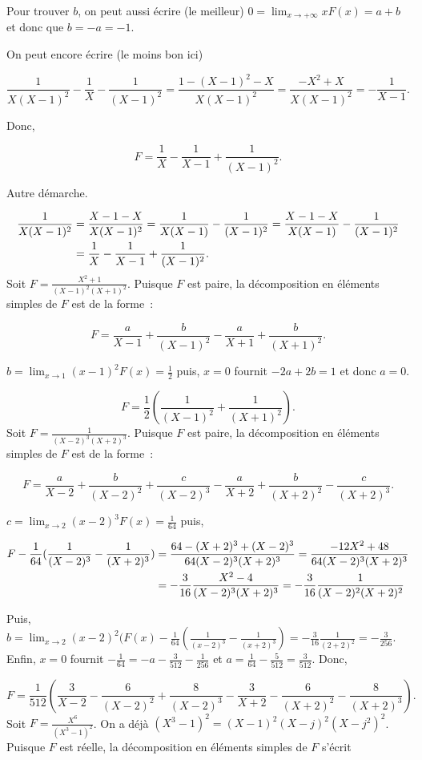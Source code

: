 {{Pour trouver $b$, on peut aussi écrire (le meilleur) $0=\lim_{x\rightarrow +\infty}xF(x)=a+b$ et donc que $b=-a=-1$.

On peut encore écrire (le moins bon ici)

$$\frac{1}{X(X-1)^2}-\frac{1}{X}-\frac{1}{(X-1)^2}=\frac{1-(X-1)^2-X}{X(X-1)^2}=\frac{-X^2+X}{X(X-1)^2}
=-\frac{1}{X-1}.$$

Donc,

$$F=\frac{1}{X}-\frac{1}{X-1}+\frac{1}{(X-1)^2}.$$

Autre démarche.

\begin{align*}\ensuremath
\frac{1}{X(X-1)^2}&=\frac{X-1-X}{X(X-1)^2}=\frac{1}{X(X-1)}-\frac{1}{(X-1)^2}
=\frac{X-1-X}{X(X-1)}-\frac{1}{(X-1)^2}\\
 &=\frac{1}{X}-\frac{1}{X-1}+\frac{1}{(X-1)^2}.
\end{align*}
Soit $F=\frac{X^2+1}{(X-1)^2(X+1)^2}$. Puisque $F$ est paire, la décomposition en éléments simples de $F$ est de la forme~:

$$F=\frac{a}{X-1}+\frac{b}{(X-1)^2}-\frac{a}{X+1}+\frac{b}{(X+1)^2}.$$

$b=\lim_{x\rightarrow 1}(x-1)^2F(x)=\frac{1}{2}$ puis, $x=0$ fournit $-2a+2b=1$ et donc $a=0$.
 
$$F=\frac{1}{2}(\frac{1}{(X-1)^2}+\frac{1}{(X+1)^2}).$$
Soit $F=\frac{1}{(X-2)^3(X+2)^3}$. Puisque $F$ est paire, la décomposition en éléments simples de $F$ est de la forme~:

$$F=\frac{a}{X-2}+\frac{b}{(X-2)^2}+\frac{c}{(X-2)^3}-\frac{a}{X+2}+\frac{b}{(X+2)^2}-\frac{c}{(X+2)^3}.$$

$c=\lim_{x\rightarrow 2}(x-2)^3F(x)=\frac{1}{64}$ puis,

\begin{align*}\ensuremath
F-\frac{1}{64}(\frac{1}{(X-2)^3}-\frac{1}{(X+2)^3})&=\frac{64-(X+2)^3+(X-2)^3}{64(X-2)^3(X+2)^3}=
\frac{-12X^2+48}{64(X-2)^3(X+2)^3}\\
 &=-\frac{3}{16}\frac{X^2-4}{(X-2)^3(X+2)^3}=-\frac{3}{16}\frac{1}{(X-2)^2(X+2)^2}
\end{align*}

Puis, $b=\lim_{x\rightarrow 2}(x-2)^2(F(x)-\frac{1}{64}(\frac{1}{(x-2)^3}-\frac{1}{(x+2)^3})=-\frac{3}{16}\frac{1}{(2+2)^2}
=-\frac{3}{256}$. Enfin, $x=0$ fournit $-\frac{1}{64}=-a-\frac{3}{512}-\frac{1}{256}$ et $a=\frac{1}{64}-\frac{5}{512}=\frac{3}{512}$. Donc,

$$F=\frac{1}{512}(\frac{3}{X-2}-\frac{6}{(X-2)^2}+\frac{8}{(X-2)^3}-\frac{3}{X+2}-\frac{6}{(X+2)^2}-\frac{8}{(X+2)^3}).$$
Soit $F=\frac{X^6}{(X^3-1)^2}$. On a déjà $(X^3-1)^2=(X-1)^2(X-j)^2(X-j^2)^2$. Puisque $F$ est réelle, la décomposition en éléments simples de $F$ s'écrit

}}
